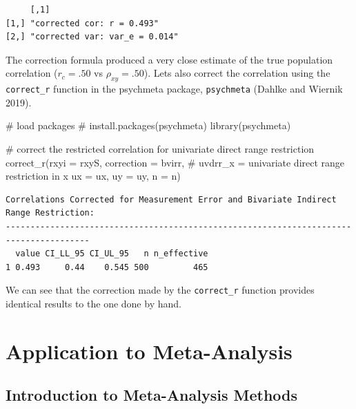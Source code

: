 \documentclass[
  letterpaper,
  DIV=11,
  numbers=noendperiod]{scrreprt}
\newenvironment{Shaded}{\begin{snugshade}}{\end{snugshade}}
\newcommand{\AttributeTok}[1]{\textcolor[rgb]{0.40,0.45,0.13}{#1}}
\newcommand{\CommentTok}[1]{\textcolor[rgb]{0.37,0.37,0.37}{#1}}
\newcommand{\FunctionTok}[1]{\textcolor[rgb]{0.28,0.35,0.67}{#1}}
\newcommand{\NormalTok}[1]{\textcolor[rgb]{0.00,0.23,0.31}{#1}}
\newcommand{\StringTok}[1]{\textcolor[rgb]{0.13,0.47,0.30}{#1}}
\begin{document}
\begin{verbatim}
     [,1]                          
[1,] "corrected cor: r = 0.493"    
[2,] "corrected var: var_e = 0.014"
\end{verbatim}

The correction formula produced a very close estimate of the true
population correlation (\(r_c = .50\) vs \(\rho_{xy}=.50\)). Lets also
correct the correlation using the \texttt{correct\_r} function in the
psychmeta package, \texttt{psychmeta} (Dahlke and Wiernik 2019).

\begin{Shaded}
\begin{Highlighting}[]
\CommentTok{\# load packages}
\CommentTok{\# install.packages(\textquotesingle{}psychmeta\textquotesingle{})}
\FunctionTok{library}\NormalTok{(psychmeta)}

\CommentTok{\# correct the restricted correlation for univariate direct range restriction}
\FunctionTok{correct\_r}\NormalTok{(}\AttributeTok{rxyi =}\NormalTok{ rxyS,}
          \AttributeTok{correction =} \StringTok{\textquotesingle{}bvirr\textquotesingle{}}\NormalTok{,  }\CommentTok{\# uvdrr\_x = univariate direct range restriction in x}
          \AttributeTok{ux =}\NormalTok{ ux,}
          \AttributeTok{uy =}\NormalTok{ uy,}
          \AttributeTok{n =}\NormalTok{ n)}
\end{Highlighting}
\end{Shaded}

\begin{verbatim}
Correlations Corrected for Measurement Error and Bivariate Indirect Range Restriction:
---------------------------------------------------------------------------------------
  value CI_LL_95 CI_UL_95   n n_effective
1 0.493     0.44    0.545 500         465
\end{verbatim}

We can see that the correction made by the \texttt{correct\_r} function
provides identical results to the one done by hand.

\part{Application to Meta-Analysis}

\hypertarget{sec-metaanalysis_intro}{%
\chapter{Introduction to Meta-Analysis
Methods}\label{sec-metaanalysis_intro}}
\end{document}
